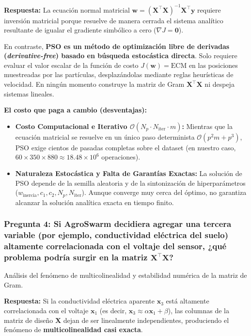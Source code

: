 \documentclass[12pt,a4paper]{article}
\begin{document}
\textbf{Respuesta:}
La ecuación normal matricial $\mathbf{w} = (\mathbf{X}^\top \mathbf{X})^{-1} \mathbf{X}^\top \mathbf{y}$ requiere inversión matricial porque resuelve de manera cerrada el sistema analítico resultante de igualar el gradiente simbólico a cero ($\nabla J = \mathbf{0}$).

En contraste, \textbf{PSO es un método de optimización libre de derivadas (\textit{derivative-free}) basado en búsqueda estocástica directa}. Solo requiere evaluar el valor escalar de la función de costo $J(\mathbf{w}) = \text{ECM}$ en las posiciones muestreadas por las partículas, desplazándolas mediante reglas heurísticas de velocidad. En ningún momento construye la matriz de Gram $\mathbf{X}^\top \mathbf{X}$ ni despeja sistemas lineales.

\textbf{El costo que paga a cambio (desventajas):}
\begin{itemize}[label={\color{p3blue}$\blacktriangleright$}]
  \item \textbf{Costo Computacional e Iterativo $\mathcal{O}(N_p \cdot N_{\text{iter}} \cdot m)$:} Mientras que la ecuación matricial se resuelve en un único paso determinista $\mathcal{O}(p^2 m + p^3)$, PSO exige cientos de pasadas completas sobre el dataset (en nuestro caso, $60 \times 350 \times 880 \approx 18.48 \times 10^6$ operaciones).
  \item \textbf{Naturaleza Estocástica y Falta de Garantías Exactas:} La solución de PSO depende de la semilla aleatoria y de la sintonización de hiperparámetros ($w_{\text{inercia}}, c_1, c_2, N_p, N_{\text{iter}}$). Aunque converge muy cerca del óptimo, no garantiza alcanzar la solución analítica exacta en tiempo finito.
\end{itemize}

\vspace{10pt}
\subsubsection*{Pregunta 4: Si AgroSwarm decidiera agregar una tercera variable (por ejemplo, conductividad eléctrica del suelo) altamente correlacionada con el voltaje del sensor, ¿qué problema podría surgir en la matriz $\mathbf{X}^\top \mathbf{X}$?}
\begin{pthreeProblem}
Análisis del fenómeno de multicolinealidad y estabilidad numérica de la matriz de Gram.
\end{pthreeProblem}

\textbf{Respuesta:}
Si la conductividad eléctrica aparente $\mathbf{x}_3$ está altamente correlacionada con el voltaje $\mathbf{x}_1$ (es decir, $\mathbf{x}_3 \approx \alpha \mathbf{x}_1 + \beta$), las columnas de la matriz de diseño $\mathbf{X}$ dejan de ser linealmente independientes, produciendo el fenómeno de \textbf{multicolinealidad casi exacta}.
\end{document}
